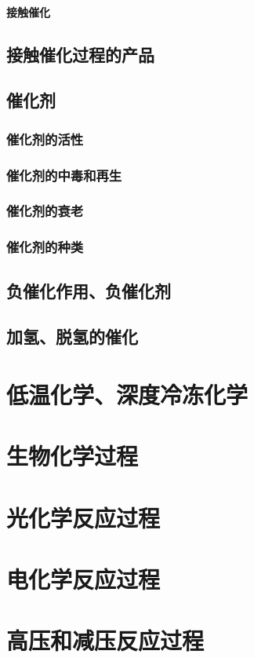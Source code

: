 \documentclass[UTF8]{../03-Chemistry}
\begin{document}
            \paragraph{接触催化}
    \subsection{接触催化过程的产品}
    \subsection{催化剂}
        \subsubsection{催化剂的活性}
        \subsubsection{催化剂的中毒和再生}
        \subsubsection{催化剂的衰老}
        \subsubsection{催化剂的种类}
    \subsection{负催化作用、负催化剂}
    \subsection{加氢、脱氢的催化}

\section{低温化学、深度冷冻化学}

\section{生物化学过程}
\section{光化学反应过程}
\section{电化学反应过程}
\section{高压和减压反应过程}
\end{document}
